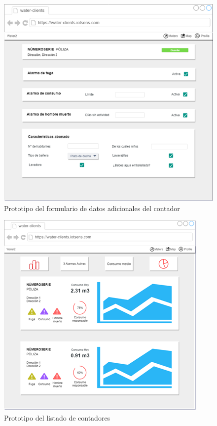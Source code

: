 \documentclass[pdftex,11pt,a4paper]{book}
\begin{document}
 \begin{figure}[h]
 \centering
 \includegraphics [scale=1] {images/prototipo/imagen5.png}
 \caption{Prototipo del formulario de datos adicionales del contador} \label{fig:prototipo5}
 \end{figure}
 
 \begin{figure}[h]
 \centering
 \includegraphics [scale=1] {images/prototipo/imagen6.png}
 \caption{Prototipo del listado de contadores} \label{fig:prototipo6}
 \end{figure}
\end{document}
